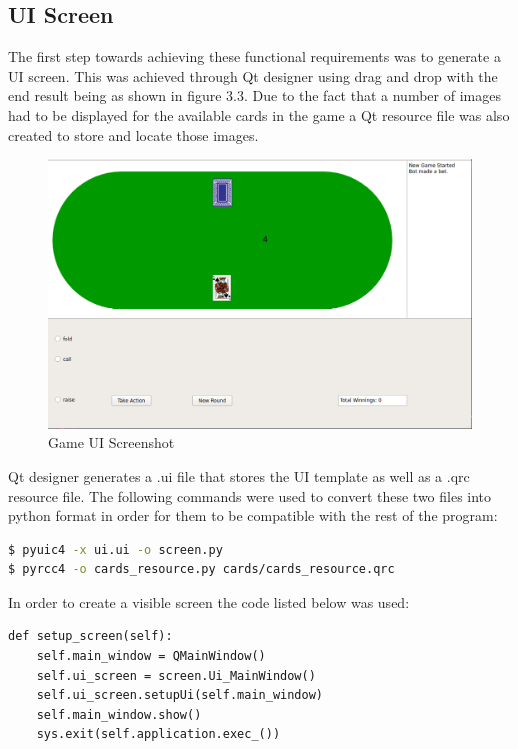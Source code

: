\subsection{UI Screen}\label{subsec:UiScreen}
The first step towards achieving these functional requirements was to generate a UI screen.
This was achieved through Qt designer using drag and drop with the end result being as shown in figure 3.3.
Due to the fact that a number of images had to be displayed for the available cards in the
game a Qt resource file was also created to store and locate those images.

\begin{figure}[ht]
    \includegraphics[scale=.4]{images/UI_screenshot.png}
    \caption{Game UI Screenshot}
\end{figure}

Qt designer generates a .ui file that stores the UI template as well as a .qrc resource file.
The following commands were used to convert these two files into python format in order for them
to be compatible with the rest of the program:
\begin{lstlisting}[language=bash]
$ pyuic4 -x ui.ui -o screen.py
$ pyrcc4 -o cards_resource.py cards/cards_resource.qrc
\end{lstlisting}

In order to create a visible screen the code listed below was used:
\begin{lstlisting}[style=Python]
def setup_screen(self):
    self.main_window = QMainWindow()
    self.ui_screen = screen.Ui_MainWindow()
    self.ui_screen.setupUi(self.main_window)
    self.main_window.show()
    sys.exit(self.application.exec_())
\end{lstlisting}

